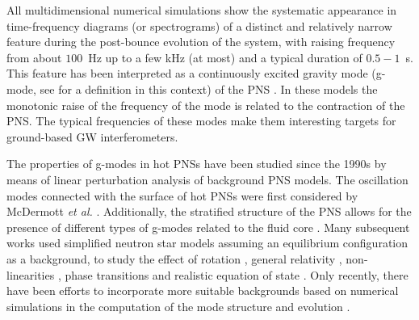 
All multidimensional numerical simulations show the systematic appearance in time-frequency diagrams (or spectrograms) of a distinct and relatively narrow feature 
%
%
during the post-bounce evolution of the system, with raising frequency
from about $100$~Hz up to a few kHz (at most) and a typical duration of $0.5-1$~s. This feature has been interpreted as a continuously excited gravity mode (g-mode, see \citep{kokkotas,Friedman:2013} for a definition in this context) of the PNS \citep{murphy:09, mueller:13gw, Cerda:2013, Yakunin:2015, Kuroda:2016, Andresen:2017}. 
In these models the monotonic raise of the frequency of the mode is related to the contraction of the PNS. The {typical} frequencies of {these} modes make them interesting targets for
ground-based GW interferometers. 
 
 The {properties of} g-modes in hot {PNSs} have been studied since the 1990s
 {by means of linear perturbation analysis of background PNS models}. The oscillation modes connected with the surface of hot PNSs were first considered by McDermott {\it et al.} \citep{McDermott:1983}. Additionally, the stratified structure of the PNS allows for the presence of different types of g-modes related to the fluid core \citep{Reisenegger:1992}. Many subsequent works used simplified neutron star models assuming an equilibrium configuration {as a background}, to study the effect of rotation \citep{Ferrari:2004}, general relativity \citep{Passamonti:2005}, non-linearities \citep{Dimmelmeier:2006}, phase transitions \citep{Kruger:2015} and realistic equation of state \citep{Camelio:2017}. {Only recently, there have been efforts to incorporate more suitable backgrounds based on numerical simulations in the computation of the mode structure and evolution \citep{Sotani:2016,Torres:2018, Morozova:2018, Torres:2019a,Torres:2019b,Sotani:2019,WS:2019,Sotani:2020a, Sotani:2020b}}.
 
